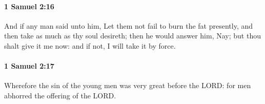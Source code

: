 		\paragraph{1 Samuel 2:16} %
			\label{1SAMUEL-2-16}

			And if any man said unto him, Let them not fail to burn the fat presently, and then take as much as thy soul desireth; then he would answer him, Nay; but thou shalt give it me now: and if not, I will take it by force.


		\paragraph{1 Samuel 2:17} %
			\label{1SAMUEL-2-17}

			Wherefore the sin of the young men was very great before the LORD: for men abhorred the offering of the LORD.


